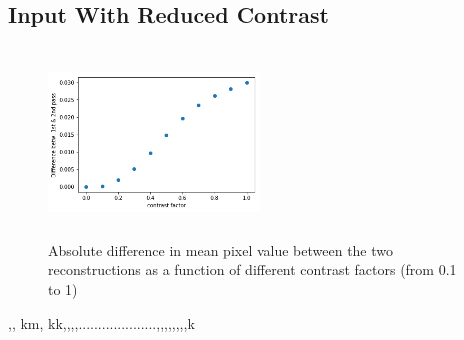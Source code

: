 \documentclass{article}
\begin{document}
  
  
  
 \subsection{Input With Reduced Contrast}
\begin{figure}[H]
      \centering
      \includegraphics[width=0.5\textwidth,height=5cm,keepaspectratio]{img/appendix/contrast/diff.png}
            \caption{Absolute difference in mean pixel value between the two reconstructions as a function of different contrast factors (from 0.1 to 1)}
      \label{fig:noiseact}
  \end{figure},,        km, kk,,,,....................,,,,,,,,k
\end{document}
